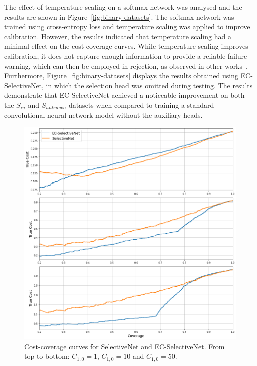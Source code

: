 The effect of temperature scaling on a softmax network was analysed and the results are shown in Figure~\ref{fig:binary-datasets}. The softmax network was trained using cross-entropy loss and temperature scaling was applied to improve calibration. However, the results indicated that temperature scaling had a minimal effect on the cost-coverage curves. While temperature scaling improves calibration, it does not capture enough information to provide a reliable failure warning, which can then be employed in rejection, as observed in other works~\citep{jaeger2022call}. Furthermore, Figure~\ref{fig:binary-datasets} displays the results obtained using EC-SelectiveNet, in which the selection head was omitted during testing. The results demonstrate that EC-SelectiveNet achieved a noticeable improvement on both the $S_{in}$ and $S_{unknown}$ datasets when compared to training a standard convolutional neural network model without the auxiliary heads.

\begin{figure}[!h]
	\centering
	\includegraphics[width=\textwidth]{images/binary_ecselectivenet.png}
	\caption{Cost-coverage curves for SelectiveNet and EC-SelectiveNet. From top to bottom: $C_{1,0}=1$, $C_{1,0}=10$ and $C_{1,0}=50$.}
	\label{fig:binary-ecselectivenet}
\end{figure}

